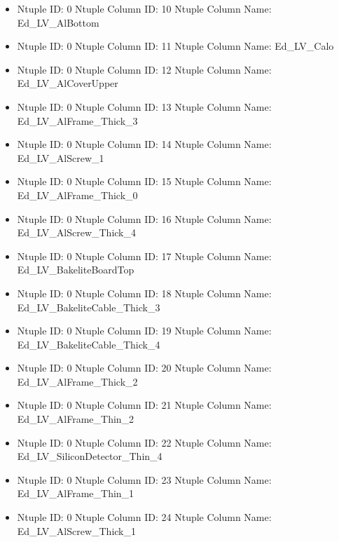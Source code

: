 \documentclass[8pt]{beamer}
\begin{document}
\begin{frame}
\begin{itemize}
        \item Ntuple ID: 0 Ntuple Column ID: 10 Ntuple Column Name: Ed\_LV\_AlBottom
        
        \item Ntuple ID: 0 Ntuple Column ID: 11 Ntuple Column Name: Ed\_LV\_Calo
        
        \item Ntuple ID: 0 Ntuple Column ID: 12 Ntuple Column Name: Ed\_LV\_AlCoverUpper
        
        \item Ntuple ID: 0 Ntuple Column ID: 13 Ntuple Column Name: Ed\_LV\_AlFrame\_Thick\_3
        
        \item Ntuple ID: 0 Ntuple Column ID: 14 Ntuple Column Name: Ed\_LV\_AlScrew\_1
        
        \item Ntuple ID: 0 Ntuple Column ID: 15 Ntuple Column Name: Ed\_LV\_AlFrame\_Thick\_0
        
        \item Ntuple ID: 0 Ntuple Column ID: 16 Ntuple Column Name: Ed\_LV\_AlScrew\_Thick\_4
        
        \item Ntuple ID: 0 Ntuple Column ID: 17 Ntuple Column Name: Ed\_LV\_BakeliteBoardTop
        
        \item Ntuple ID: 0 Ntuple Column ID: 18 Ntuple Column Name: Ed\_LV\_BakeliteCable\_Thick\_3
        
        \item Ntuple ID: 0 Ntuple Column ID: 19 Ntuple Column Name: Ed\_LV\_BakeliteCable\_Thick\_4
        
        \item Ntuple ID: 0 Ntuple Column ID: 20 Ntuple Column Name: Ed\_LV\_AlFrame\_Thick\_2
        
        \item Ntuple ID: 0 Ntuple Column ID: 21 Ntuple Column Name: Ed\_LV\_AlFrame\_Thin\_2
        
        \item Ntuple ID: 0 Ntuple Column ID: 22 Ntuple Column Name: Ed\_LV\_SiliconDetector\_Thin\_4
        
        \item Ntuple ID: 0 Ntuple Column ID: 23 Ntuple Column Name: Ed\_LV\_AlFrame\_Thin\_1
        
        \item Ntuple ID: 0 Ntuple Column ID: 24 Ntuple Column Name: Ed\_LV\_AlScrew\_Thick\_1
        

\end{itemize}
\end{frame}
\end{document}

